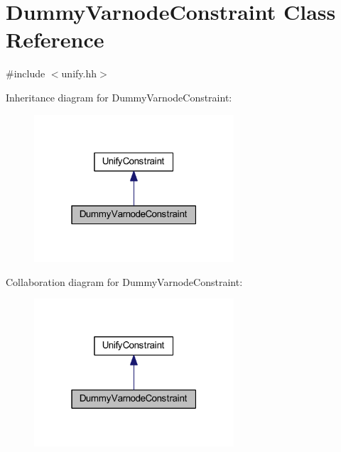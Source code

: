 \hypertarget{class_dummy_varnode_constraint}{}\section{Dummy\+Varnode\+Constraint Class Reference}
\label{class_dummy_varnode_constraint}


{\ttfamily \#include $<$unify.\+hh$>$}



Inheritance diagram for Dummy\+Varnode\+Constraint\+:
\nopagebreak
\begin{figure}[H]
\begin{center}
\leavevmode
\includegraphics[width=211pt]{class_dummy_varnode_constraint__inherit__graph}
\end{center}
\end{figure}


Collaboration diagram for Dummy\+Varnode\+Constraint\+:
\nopagebreak
\begin{figure}[H]
\begin{center}
\leavevmode
\includegraphics[width=211pt]{class_dummy_varnode_constraint__coll__graph}
\end{center}
\end{figure}
